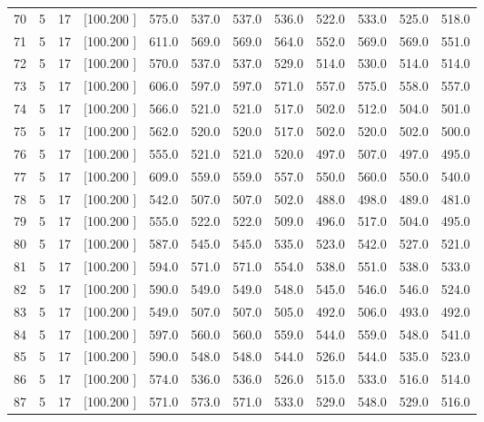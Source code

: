 \documentclass[12pt,a4paper]{article}
\begin{document}
\begin{center}
{\begin{tabular}{r r r r r r r r r r r r}
  70&  5& 17&[100.200   ]&   575.0&   537.0&   537.0&   536.0&   522.0&   533.0&   525.0&   518.0\\[-0.02in]
  71&  5& 17&[100.200   ]&   611.0&   569.0&   569.0&   564.0&   552.0&   569.0&   569.0&   551.0\\[-0.02in]
  72&  5& 17&[100.200   ]&   570.0&   537.0&   537.0&   529.0&   514.0&   530.0&   514.0&   514.0\\[-0.02in]
  73&  5& 17&[100.200   ]&   606.0&   597.0&   597.0&   571.0&   557.0&   575.0&   558.0&   557.0\\[-0.02in]
  74&  5& 17&[100.200   ]&   566.0&   521.0&   521.0&   517.0&   502.0&   512.0&   504.0&   501.0\\[-0.02in]
  75&  5& 17&[100.200   ]&   562.0&   520.0&   520.0&   517.0&   502.0&   520.0&   502.0&   500.0\\[-0.02in]
  76&  5& 17&[100.200   ]&   555.0&   521.0&   521.0&   520.0&   497.0&   507.0&   497.0&   495.0\\[-0.02in]
  77&  5& 17&[100.200   ]&   609.0&   559.0&   559.0&   557.0&   550.0&   560.0&   550.0&   540.0\\[-0.02in]
  78&  5& 17&[100.200   ]&   542.0&   507.0&   507.0&   502.0&   488.0&   498.0&   489.0&   481.0\\[-0.02in]
  79&  5& 17&[100.200   ]&   555.0&   522.0&   522.0&   509.0&   496.0&   517.0&   504.0&   495.0\\[-0.02in]
  80&  5& 17&[100.200   ]&   587.0&   545.0&   545.0&   535.0&   523.0&   542.0&   527.0&   521.0\\[-0.02in]
  81&  5& 17&[100.200   ]&   594.0&   571.0&   571.0&   554.0&   538.0&   551.0&   538.0&   533.0\\[-0.02in]
  82&  5& 17&[100.200   ]&   590.0&   549.0&   549.0&   548.0&   545.0&   546.0&   546.0&   524.0\\[-0.02in]
  83&  5& 17&[100.200   ]&   549.0&   507.0&   507.0&   505.0&   492.0&   506.0&   493.0&   492.0\\[-0.02in]
  84&  5& 17&[100.200   ]&   597.0&   560.0&   560.0&   559.0&   544.0&   559.0&   548.0&   541.0\\[-0.02in]
  85&  5& 17&[100.200   ]&   590.0&   548.0&   548.0&   544.0&   526.0&   544.0&   535.0&   523.0\\[-0.02in]
  86&  5& 17&[100.200   ]&   574.0&   536.0&   536.0&   526.0&   515.0&   533.0&   516.0&   514.0\\[-0.02in]
  87&  5& 17&[100.200   ]&   571.0&   573.0&   571.0&   533.0&   529.0&   548.0&   529.0&   516.0\\[-0.02in]

\end{tabular}}
\end{center}
\end{document}

